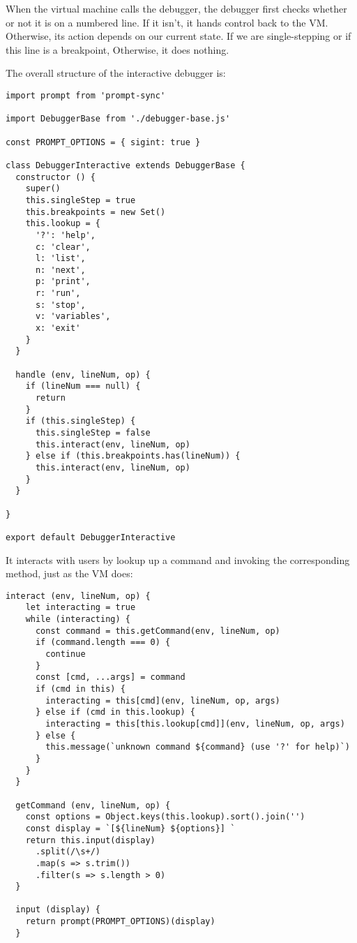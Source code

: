 \documentclass[krantzl]{krantz}
\begin{document}
When the virtual machine calls the debugger,
the debugger first checks whether or not it is on a numbered line.
If it isn't,
it hands control back to the VM.
Otherwise,
its action depends on our current state.
If we are single-stepping or if this line is a breakpoint,
Otherwise, it does nothing.


The overall structure of the interactive debugger is:


\begin{lstlisting}[frame=single,frameround=tttt]
import prompt from 'prompt-sync'

import DebuggerBase from './debugger-base.js'

const PROMPT_OPTIONS = { sigint: true }

class DebuggerInteractive extends DebuggerBase {
  constructor () {
    super()
    this.singleStep = true
    this.breakpoints = new Set()
    this.lookup = {
      '?': 'help',
      c: 'clear',
      l: 'list',
      n: 'next',
      p: 'print',
      r: 'run',
      s: 'stop',
      v: 'variables',
      x: 'exit'
    }
  }

  handle (env, lineNum, op) {
    if (lineNum === null) {
      return
    }
    if (this.singleStep) {
      this.singleStep = false
      this.interact(env, lineNum, op)
    } else if (this.breakpoints.has(lineNum)) {
      this.interact(env, lineNum, op)
    }
  }

}

export default DebuggerInteractive
\end{lstlisting}



\noindent It interacts with users by lookup up a command and invoking the corresponding method,
just as the VM does:


\begin{lstlisting}[frame=single,frameround=tttt]
  interact (env, lineNum, op) {
    let interacting = true
    while (interacting) {
      const command = this.getCommand(env, lineNum, op)
      if (command.length === 0) {
        continue
      }
      const [cmd, ...args] = command
      if (cmd in this) {
        interacting = this[cmd](env, lineNum, op, args)
      } else if (cmd in this.lookup) {
        interacting = this[this.lookup[cmd]](env, lineNum, op, args)
      } else {
        this.message(`unknown command ${command} (use '?' for help)`)
      }
    }
  }

  getCommand (env, lineNum, op) {
    const options = Object.keys(this.lookup).sort().join('')
    const display = `[${lineNum} ${options}] `
    return this.input(display)
      .split(/\s+/)
      .map(s => s.trim())
      .filter(s => s.length > 0)
  }

  input (display) {
    return prompt(PROMPT_OPTIONS)(display)
  }
\end{lstlisting}
\end{document}
